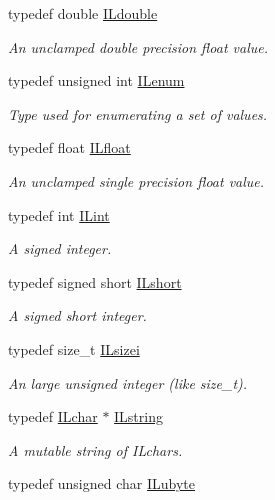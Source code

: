 \begin{DoxyCompactItemize}
typedef double \hyperlink{group__il__types_ga3896ba656038eb34345347cd095b020a}{I\+Ldouble}
\begin{DoxyCompactList}\small\item\em An unclamped double precision float value. \end{DoxyCompactList}\item 
typedef unsigned int \hyperlink{group__il__types_ga62ca73445716183ef42b1f3906a45ed0}{I\+Lenum}
\begin{DoxyCompactList}\small\item\em Type used for enumerating a set of values. \end{DoxyCompactList}\item 
typedef float \hyperlink{group__il__types_ga376156c9461893f4b1a5de9579dc86f2}{I\+Lfloat}
\begin{DoxyCompactList}\small\item\em An unclamped single precision float value. \end{DoxyCompactList}\item 
typedef int \hyperlink{group__il__types_ga8effe51a00daaa0878631e5af75a36cb}{I\+Lint}
\begin{DoxyCompactList}\small\item\em A signed integer. \end{DoxyCompactList}\item 
typedef signed short \hyperlink{group__il__types_gaecbb74c86cc28ee190923c1b167a50fc}{I\+Lshort}
\begin{DoxyCompactList}\small\item\em A signed short integer. \end{DoxyCompactList}\item 
typedef size\+\_\+t \hyperlink{group__il__types_gad51812c5d3fd67d85973dd7a7cb80d8e}{I\+Lsizei}
\begin{DoxyCompactList}\small\item\em An large unsigned integer (like size\+\_\+t). \end{DoxyCompactList}\item 
typedef \hyperlink{group__il__types_gabb6e047662a2e8131c5bcd785c84ff02}{I\+Lchar} $\ast$ \hyperlink{group__il__types_ga683acc99ae9bac7978edfa5588962b52}{I\+Lstring}
\begin{DoxyCompactList}\small\item\em A mutable string of {\itshape I\+Lchars}. \end{DoxyCompactList}\item 
typedef unsigned char \hyperlink{group__il__types_ga057357939bc5a12e8061715453568519}{I\+Lubyte}

\end{DoxyCompactItemize}
